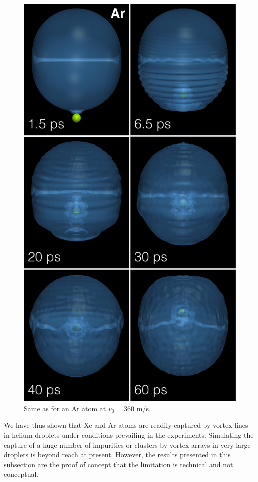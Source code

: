 \begin{figure}[h]
\centerline{\includegraphics[width=0.60\linewidth,clip]{fig11}}
\caption{\label{fig11-capture} 
Same as  for an Ar atom at $v_0 = 360$ m/s\citep{Coppens2017-2}.
}
\end{figure}

 

We have thus shown that   Xe and Ar atoms are readily captured by vortex lines in helium droplets under conditions prevailing in the experiments\citep{Gom14,Jones2016}. Simulating the 
capture of a huge number of  impurities or clusters by vortex arrays in  very large droplets is beyond reach at present. However, the results presented in
this subsection are the proof of concept that the limitation is technical and not conceptual.

